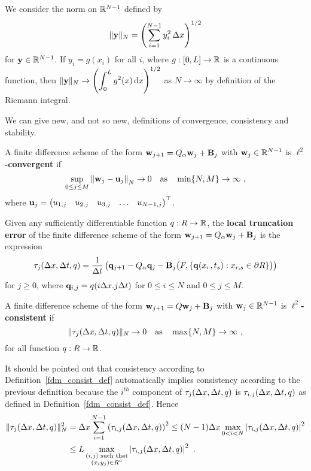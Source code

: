 We consider the norm on $\mathbb{R}^{N-1}$ defined by
\[
  \| \mathbf{y} \|_N = \left(\sum_{i=1}^{N-1} y_i^2\,\Delta{x}\right)^{1/2}
\]
for $\mathbf{y} \in \mathbb{R}^{N-1}$.  If $y_i = g(x_i)$ for all $i$, where
$g:[0,L]\to \mathbb{R}$ is a continuous function, then
$\displaystyle \|\mathbf{y} \|_N \to \left( \int_0^L g^2(x)\,\mathrm{d}x\right)^{1/2}$
as $N \to \infty$ by definition of the Riemann integral.

We can give new, and not so new, definitions of convergence,
consistency and stability.

\begin{defn} \label{ell2ConvDefN2}
A finite difference scheme of the form
$\mathbf{w}_{j+1} = Q_\alpha\mathbf{w}_j + \mathbf{B}_j$
with $\mathbf{w}_j \in \mathbb{R}^{N-1}$ is {\bfseries $\ell^2$-convergent}
 if
\[
  \sup_{0\leq j \leq M} \left\| \mathbf{w}_j - \mathbf{u}_j \right\|_N \to 0
  \quad \text{as} \quad \min\{N,M\} \to \infty \ ,
\]
where $\displaystyle \mathbf{u}_j = \begin{pmatrix}
u_{1,j} & u_{2,j} & u_{3,j} & \ldots & u_{N-1,j} \end{pmatrix}^\top$.
\end{defn}

\begin{defn} \label{fdm_consist_defN2}
Given any sufficiently differentiable function $q:R \to \mathbb{R}$,
the {\bfseries local truncation error} of the finite difference scheme of the form
$\mathbf{w}_{j+1} = Q_\alpha\mathbf{w}_j + \mathbf{B}_j$ is the expression
\[
\mathbf{\tau}_j(\Delta{x},\Delta{t},q) = \frac{1}{\Delta{t}}
\left(\mathbf{q}_{j+1} - Q_\alpha \mathbf{q}_j -
\mathbf{B}_j\big(F, \{ \mathbf{q}(x_r,t_s) :x_{r,s} \in \partial R\} \big) \right)
\]
for $j\geq 0$, where $\mathbf{q}_{i,j} = q(i\Delta{x}.j\Delta{t})$ for $0\leq i\leq N$
and $0\leq j \leq M$.

A finite difference scheme of the form $\mathbf{w}_{j+1} = Q\mathbf{w}_j + \mathbf{B}_j$
with $\mathbf{w}_j \in \mathbb{R}^{N-1}$ is {\bfseries $\ell^2$-consistent}
 if
\[
\| \mathbf{\tau}_j(\Delta{x},\Delta{t},q) \|_N \to 0 \quad \text{as} \quad
\max\{N,M\} \to \infty \ ,
\]
for all function $q:R \to \mathbb{R}$.
\end{defn}

\begin{rmk}
It should be pointed out that consistency according to
Definition~\ref{fdm_consist_def} automatically implies
consistency according to the previous definition because the $i^{th}$
component of $\mathbf{\tau}_j(\Delta{x},\Delta{t},q)$ is
$\tau_{i,j}(\Delta{x},\Delta{t},q)$ as defined in 
Definition~\ref{fdm_consist_def}.  Hence
\begin{align*}
\| \mathbf{\tau}_j(\Delta{x},\Delta{t},q) \|_N^2
&= \Delta{x} \sum_{i=1}^{N-1} \left(\tau_{i,j} (\Delta{x},\Delta{t},q)\right)^2
\leq (N-1)\Delta{x} \max_{0<i<N} \left|\tau_{i,j} (\Delta{x},\Delta{t},q)\right|^2 \\
&\leq L \max_{\substack{(i,j) \text{ such that}\\(x_iy_j) \in R^o}}
\left|\tau_{i,j} (\Delta{x},\Delta{t},q)\right|^2 \ .
\end{align*}
\label{rmk_consist_defN2}
\end{rmk}

